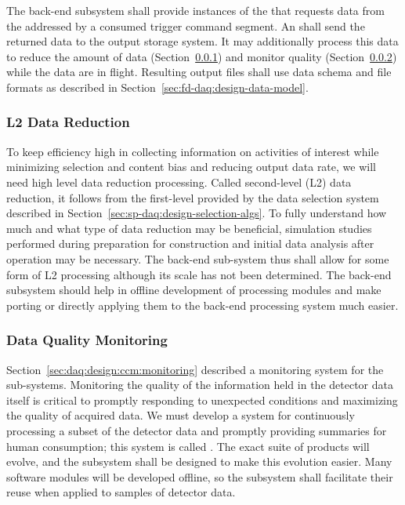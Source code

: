 The  back-end subsystem shall provide instances of the  that requests data from the  addressed by a consumed trigger command segment.  An  shall send the returned data to the output storage system.  It may additionally process this data to reduce the amount of data (Section~\ref{sec:fd-daq:design-data-reduction}) and monitor quality (Section~\ref{sec:fd-daq:design-data-quality}) while the data are in flight. 
Resulting output files shall use data schema and file formats as described in Section~\ref{sec:fd-daq:design-data-model}.


\subsubsection{L2 Data Reduction}
\label{sec:fd-daq:design-data-reduction}

To keep efficiency high in collecting information on activities of interest while minimizing selection and content bias and reducing output data rate, we will need high level data reduction processing. 
Called second-level (L2) data reduction, it follows from the first-level provided by the data selection system described in Section~\ref{sec:sp-daq:design-selection-algs}.
To fully understand how much and what type of data reduction may be beneficial, simulation studies performed during preparation for construction and initial data analysis after operation may be necessary. 
The  back-end sub-system thus shall allow for some form of L2 processing although its scale has not been determined. 
The back-end subsystem should help in offline development of processing modules and make porting or directly applying them to the back-end processing system much easier.



\subsubsection{Data Quality Monitoring}
\label{sec:fd-daq:design-data-quality}

Section~\ref{sec:daq:design:ccm:monitoring} described a monitoring system for the  sub-systems. 
Monitoring the quality of the information held in the detector data itself is critical to promptly responding to unexpected conditions and maximizing the quality of acquired data. 
We must develop a system for continuously processing a subset of the detector data and promptly providing summaries for human consumption; this system is called  .
The exact suite of products will evolve, and the  subsystem shall be designed to make this evolution easier. 
Many software modules will be developed offline, so the  subsystem shall facilitate their reuse when applied to samples of detector data.


